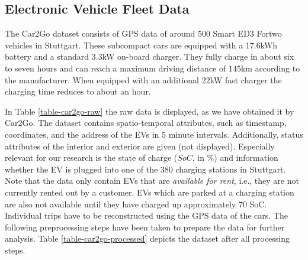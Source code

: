 \documentclass[a4paper, 12pt]{article}
\begin{document}
\subsection{Electronic Vehicle Fleet Data}
\label{sec:org8b15dfe}
The Car2Go dataset consists of GPS data of around 500 Smart ED3 Fortwo vehicles in
Stuttgart. These subcompact cars are equipped with a 17.6kWh battery and a
standard 3.3kW on-board charger. They fully charge in about six to seven hours
and can reach a maximum driving distance of 145km according to the manufacturer.
When equipped with an additional 22kW fast charger the charging time reduces to
about an hour.

In Table \ref{table-car2go-raw} the raw data is displayed, as we have obtained it
by Car2Go. The dataset contains spatio-temporal attributes, such as timestamp,
coordinates, and the address of the EVs in 5 minute intervals. Additionally,
status attributes of the interior and exterior are given (not displayed).
Especially relevant for our research is the state of charge (\(SoC\), in \%) and
information whether the EV is plugged into one of the 380 charging stations in
Stuttgart. Note that the data only contain EVs that are \emph{available for rent},
i.e., they are not currently rented out by a customer. EVs which are parked at a
charging station are also not available until they have charged up approximately
70 SoC. Individual trips have to be reconstructed using the GPS data of the
cars. The following preprocessing steps have been taken to prepare the data for
further analysis. Table \ref{table-car2go-processed} depicts the dataset after all
processing steps.
\end{document}
